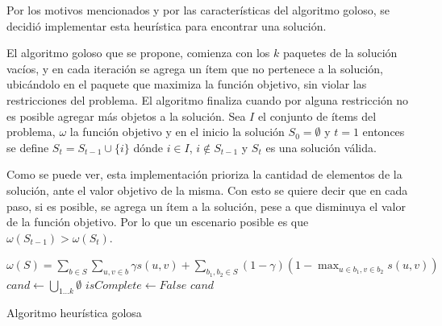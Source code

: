Por los motivos mencionados y por las características del algoritmo goloso, se decidió implementar esta heurística para encontrar una solución. 

El algoritmo goloso que se propone, comienza con los $k$ paquetes de la solución vacíos, y en cada iteración se agrega un ítem que no pertenece a la solución, ubicándolo en el paquete que maximiza la función objetivo, sin violar las restricciones del problema. El algoritmo finaliza cuando por alguna restricción no es posible agregar más objetos a la solución. Sea $I$ el conjunto de ítems del problema, $\omega$ la función objetivo y en el inicio la solución $S_0 = \emptyset$ y $t=1$ entonces se define $S_t = S_{t-1} \cup \{i\}$ dónde $i \in I$, $i \notin S_{t-1}$ y $S_t$ es una solución válida. 

Como se puede ver, esta implementación prioriza la cantidad de elementos de la solución, ante el valor objetivo de la misma. Con esto se quiere decir que en cada paso, si es posible, se agrega un ítem a la solución, pese a que disminuya el valor de la función objetivo. Por lo que un escenario posible es que $\omega(S_{t-1}) > \omega(S_t)$.

\begin{center}
	\begin{algorithm}[H]
	\DontPrintSemicolon
	\SetAlgoLined
		$\omega(S) = \sum_{b \in S}{\sum_{u,v \in b}{\gamma s(u,v)}} + \sum_{b_1,b_2 \in S}{(1-\gamma) (1-\max_{u \in b_1, v \in b_2}{s(u,v)})}$\;
		$cand \leftarrow \bigcup_{1 \ldots k}\emptyset$\;
		$isComplete \leftarrow False$\;
		\Return $cand$\;
	\caption{Algoritmo heurística golosa}\label{alg:algHeuGol}
	\end{algorithm}
\end{center}

